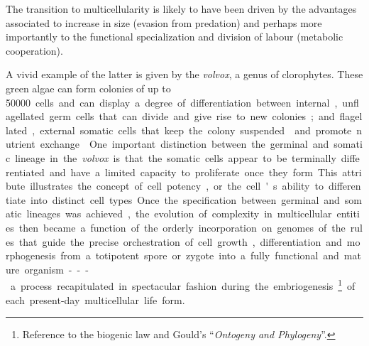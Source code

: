 The transition to multicellularity is likely to have been driven by the
advantages associated to increase in size (evasion from predation) and perhaps
more importantly to the functional specialization and division of labour
(metabolic cooperation).

A vivid example of the latter is given by the \emph{volvox}, a genus of
clorophytes.  These green algae can form colonies of up to \SI{50000} cells and
can display a degree of differentiation between internal, unflagellated germ
cells that can divide and give rise to new colonies; and flagellated, external
somatic cells that keep the colony suspended\cite{kirk_volvox:_2005} and promote
nutrient exchange.\cite{solari_multicellularity_2006}

One important distinction between the germinal and somatic lineage in the
\emph{volvox} is that the somatic cells appear to be terminally differentiated
and have a limited capacity to proliferate once they form.  This attribute
illustrates the concept of cell potency, or the cell's ability to differentiate
into distinct cell types.

Once the specification between germinal and somatic lineages was achieved, the
evolution of complexity in multicellular entities then became a function of the
orderly incorporation on genomes of the rules that guide the precise
orchestration of cell growth, differentiation and morphogenesis from a
totipotent spore or zygote into a fully functional and mature organism---a
process recapitulated in spectacular fashion during the
embriogenesis\footnote{ Reference to the biogenic law and
  Gould's ``\emph{Ontogeny and Phylogeny}''.}  of each \mbox{present-day}
multicellular life form.






